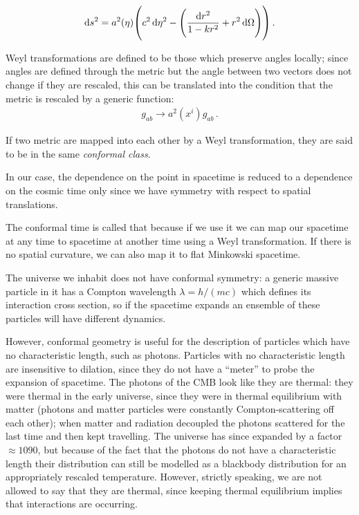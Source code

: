 \documentclass[main.tex]{subfiles}
\begin{document}
\begin{equation}
  \dd{s^2} = a^2 (\eta) \qty(c^2 \dd{\eta^2} - \qty(\frac{\dd{r^2}}{1 - kr^2} + r^2 \dd{\Omega})) \,.
\end{equation}



\begin{bluebox}
Weyl transformations are defined to be those which preserve angles locally; since angles are defined through the metric but the angle between two vectors does not change if they are rescaled, this can be translated into the condition that the metric is rescaled by a generic function:
%
\begin{align}
g_{ab} \rightarrow a^2(x^{i}) g_{ab}
\,.
\end{align}

If two metric are mapped into each other by a Weyl transformation, they are said to be in the same \emph{conformal class}. 

In our case, the dependence on the point in spacetime is reduced to a dependence on the cosmic time only since we have symmetry with respect to spatial translations.

The conformal time is called that because if we use it we can map our spacetime at any time to spacetime at another time using a Weyl transformation. 
If there is no spatial curvature, we can also map it to flat Minkowski spacetime. 
\end{bluebox}

The universe we inhabit does not have conformal symmetry: a generic massive particle in it has a Compton wavelength \(\lambda = h / (mc)\) which defines its interaction cross section, so if the spacetime expands an ensemble of these particles will have different dynamics.

However, conformal geometry is useful for the description of particles which have no characteristic length, such as photons. Particles with no characteristic length are insensitive to dilation, since they do not have a ``meter'' to probe the expansion of spacetime.
The photons of the CMB look like they are thermal: they were thermal in the early universe, since they were in thermal equilibrium with matter (photons and matter particles were constantly Compton-scattering off each other); when matter and radiation decoupled the photons scattered for the last time and then kept travelling.
The universe has since expanded by a factor \(\approx 1090\), but because of the fact that the photons do not have a characteristic length their distribution can still be modelled as a blackbody distribution for an appropriately rescaled temperature. However, strictly speaking, we are not allowed to say that they are thermal, since keeping thermal equilibrium implies that interactions are occurring.
\end{document}
